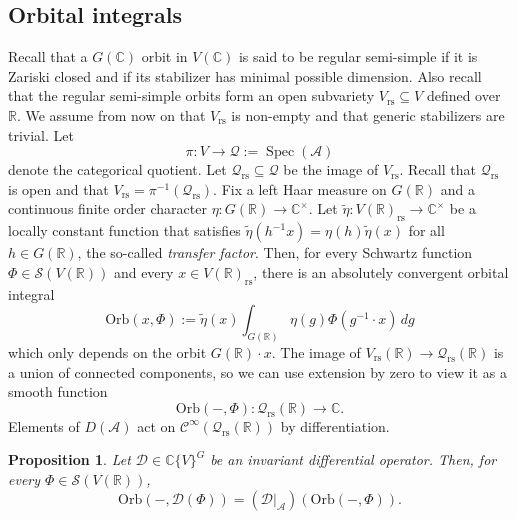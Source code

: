 \documentclass[reqno, 11pt]{amsart} %
\numberwithin{equation}{section}
\theoremstyle{plain}
\newtheorem{proposition}[theorem]{Proposition}
\theoremstyle{definition}
\theoremstyle{remark}
\newcommand{\mr}{\mathrm}
\newcommand{\wt}{\widetilde}
\newcommand{\lr}{\longrightarrow}
\newcommand{\mbC}{\mathbb{C}}
\newcommand{\mbR}{\mathbb{R}}
\newcommand{\mcA}{\mathcal{A}}
\newcommand{\mcC}{\mathcal{C}}
\newcommand{\mcD}{\mathcal{D}}
\newcommand{\mcQ}{\mathcal{Q}}
\newcommand{\mcS}{\mathcal{S}}
\newcommand{\rs}{\mr{rs}}
\DeclareMathOperator{\Spec}{Spec}
\newcommand{\Orb}{\mathrm{Orb}}
\begin{document}
\subsection{Orbital integrals}
\label{ss:orb_ints_abstractly}
 Recall that a $G(\mbC)$ orbit in $V(\mbC)$ is said to be regular semi-simple if it is Zariski closed and if its stabilizer has minimal possible dimension. Also recall that the regular semi-simple orbits form an open subvariety $V_\rs \subseteq V$ defined over $\mbR$. We assume from now on that $V_\rs$ is non-empty and that generic stabilizers are trivial. Let
$$π:V\lr \mcQ := \Spec(\mcA)$$
denote the categorical quotient. Let $\mcQ_\rs\subseteq \mcQ$ be the image of $V_\rs$. Recall that $\mcQ_\rs$ is open and that $V_\rs = π^{-1}(\mcQ_\rs)$. Fix a left Haar measure on $G(\mbR)$ and a continuous finite order character $η:G(\mbR)\to \mbC^\times$. Let $\wt{η}:V(\mbR)_\rs\to \mbC^\times$ be a locally constant function that satisfies $\wt{η}(h^{-1}x) = η(h)\wt{η}(x)$ for all $h\in G(\mbR)$, the so-called \emph{transfer factor}. Then, for every Schwartz function $Φ\in \mcS(V(\mbR))$ and every $x\in V(\mbR)_\rs$, there is an absolutely convergent orbital integral
$$\Orb(x, Φ) := \wt{η}(x)\int_{G(\mbR)} η(g)Φ(g^{-1}\cdot x)\,dg$$
which only depends on the orbit $G(\mbR)\cdot x$. The image of $V_\rs(\mbR)\to \mcQ_\rs(\mbR)$ is a union of connected components, so we can use extension by zero to view it as a smooth function
$$\Orb(-,Φ):\mcQ_\rs(\mbR)\lr \mbC.$$
Elements of $D(\mcA)$ act on $\mcC^\infty(\mcQ_\rs(\mbR))$ by differentiation.
\begin{proposition}\label{prop:diff_op_orb_int_generic}
Let $\mcD\in \mbC\{V\}^G$ be an invariant differential operator. Then, for every $Φ\in \mcS(V(\mbR))$,
$$\Orb(-, \mcD(Φ)) = (\mcD\vert_\mcA)(\Orb(-, Φ)).$$
\end{proposition}
\end{document}
